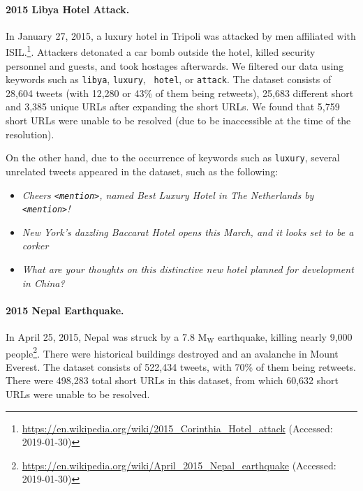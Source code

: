 \paragraph{2015 Libya Hotel Attack.} 
%
In January 27, 2015, a luxury hotel in Tripoli was attacked by men affiliated
with
ISIL.\footnote{\url{https://en.wikipedia.org/wiki/2015_Corinthia_Hotel_attack}
(Accessed: 2019-01-30)}. 
%
Attackers detonated a car bomb outside the hotel, killed security personnel and
guests, and took hostages afterwards. 
%
We filtered our data using keywords such as {\tt libya}, {\tt luxury}, {\tt
hotel}, or {\tt attack}. 
The dataset consists of 28,604 tweets (with 12,280 or 43\% of them being
retweets), 25,683 different short and 3,385 unique URLs after expanding the
short URLs. 
%
We found that 5,759 short URLs were unable to be resolved (due to be
inaccessible at the time of the resolution).

On the other hand, due to the occurrence of keywords such as {\tt luxury},
several unrelated tweets appeared in the dataset, such as the following:

\begin{itemize}
\item {\it Cheers {\tt <mention>}, named Best Luxury Hotel in The Netherlands by {\tt <mention>}!}
\item {\it New York's dazzling Baccarat Hotel opens this March, and it looks set to be a corker}
\item {\it What are your thoughts on this distinctive new hotel planned for development in China?}
\end{itemize}


\paragraph{2015 Nepal Earthquake.} 
%
In April 25, 2015, Nepal was struck by a 7.8 $\text{M}_\text{W}$ earthquake,
killing nearly 9,000
people\footnote{\url{https://en.wikipedia.org/wiki/April_2015_Nepal_earthquake}
(Accessed: 2019-01-30)}. There were historical buildings destroyed and an avalanche
in Mount Everest.
%
The dataset consists of 522,434 tweets, with 70\% of them being retweets.
%
There were 498,283 total short URLs in this dataset, from which 60,632 short
URLs were unable to be resolved.

